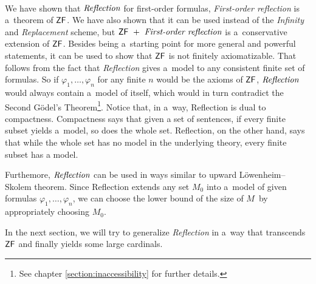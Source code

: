 \



We have shown that $\emph{Reflection}$ for first-order formulas, \emph{First-order reflection} is a~theorem of $\sf{ZF}$.%
We have also shown that it can be used instead of the \emph{Infinity} and \emph{Replacement} scheme, but $\sf{ZF}\ +\ \emph{First-order reflection}$ is a~conservative extension of $\sf{ZF}$. Besides being a~starting point for more general and powerful statements, it can be used to show that $\sf{ZF}$ is not finitely axiomatizable. That follows from the fact that \emph{Reflection} gives a~model to any consistent finite set of formulas. %
So if $\varphi_1, \ldots, \varphi_n$ for any finite $n$ would be the axioms of $\sf{ZF}$, $\emph{Reflection}$ would always contain a~model of itself, which would in turn contradict the Second Gödel's Theorem\footnote{See chapter \ref{section:inaccessibility} for further details.}.
Notice that, in a~way, Reflection is dual to compactness. 
Compactness says that given a set of sentences, if every finite subset yields a~model, so does the whole set. Reflection, on the other hand, says that while the whole set has no model in the underlying theory, every finite subset has a model.

Furthemore, $\emph{Reflection}$ can be used in ways similar to upward Löwenheim–Skolem theorem.
Since Reflection extends any set $M_0$ into a~model of given formulas $\varphi_1, \ldots, \varphi_n$, we can choose the lower bound of the size of $M$ by appropriately choosing $M_0$.

In the next section, we will try to generalize \emph{Reflection} in a~way that transcends $\sf{ZF}$ and finally yields some large cardinals.
\newpage
